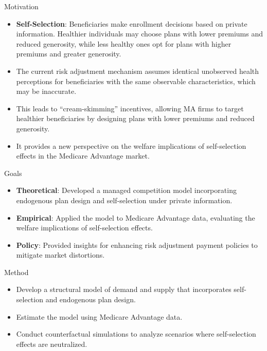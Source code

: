 \documentclass{beamer}
\begin{document}
\begin{frame}[t]
\begin{columns}[t]
\begin{column}{.45\textwidth}
      \begin{block}{Motivation}
        \begin{itemize}
            \item \textbf{Self-Selection}: Beneficiaries make enrollment decisions based on private information. Healthier individuals may choose plans with lower premiums and reduced generosity, while less healthy ones opt for plans with higher premiums and greater generosity.
            \item The current risk adjustment mechanism assumes identical unobserved health perceptions for beneficiaries with the same observable characteristics, which may be inaccurate.
            \item This leads to ``cream-skimming'' incentives, allowing MA firms to target healthier beneficiaries by designing plans with lower premiums and reduced generosity.
            \item It provides a new perspective on the welfare implications of self-selection effects in the Medicare Advantage market.
        \end{itemize}
      \end{block}
      \begin{block}{Goals}
        \begin{itemize}
          \item \textbf{Theoretical}: Developed a managed competition model incorporating endogenous plan design and self-selection under private information.
          \item \textbf{Empirical}: Applied the model to Medicare Advantage data, evaluating the welfare implications of self-selection effects.
          \item \textbf{Policy}: Provided insights for enhancing risk adjustment payment policies to mitigate market distortions.
        \end{itemize}
      \end{block}
      \begin{block}{Method}
        \begin{itemize}
          \item Develop a structural model of demand and supply that incorporates self-selection and endogenous plan design.
          \item Estimate the model using Medicare Advantage data.
          \item Conduct counterfactual simulations to analyze scenarios where self-selection effects are neutralized.
        \end{itemize}
      \end{block}
    \end{column}



\end{columns}
\end{frame}
\end{document}
